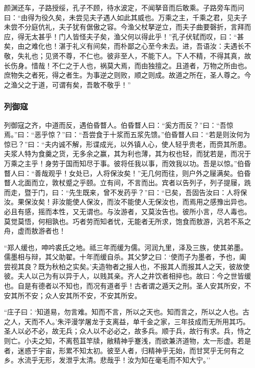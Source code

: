 \documentclass[]{article}
\begin{document}
颜渊还车，子路授绥，孔子不顾，待水波定，不闻拏音而后敢乘。子路旁车而问曰：``由得为役久矣，未尝见夫子遇人如此其威也。万乘之主，千乘之君，见夫子未尝不分庭伉礼，夫子犹有倨傲之容。今渔父杖拏逆立，而夫子曲要磬折，言拜而应，得无太甚乎！门人皆怪夫子矣，渔父何以得此乎！''孔子伏轼而叹，曰：``甚矣，由之难化也！湛于礼义有间矣，而朴鄙之心至今未去。进，吾语汝：夫遇长不敬，失礼也；见贤不尊，不仁也。彼非至人，不能下人。下人不精，不得其真，故长伤身。惜哉！不仁之于人也，祸莫大焉，而由独擅之。且道者，万物之所由也。庶物失之者死，得之者生。为事逆之则败，顺之则成。故道之所在，圣人尊之。今之渔父之于道，可谓有矣，吾敢不敬乎！''

\hypertarget{header-n500}{%
\subsubsection{列御寇}\label{header-n500}}

列御寇之齐，中道而反，遇伯昏瞀人。伯昏瞀人曰：``奚方而反？''曰：``吾惊焉。''曰：``恶乎惊？''曰：``吾尝食于十浆而五浆先馈。''伯昏瞀人曰：``若是则汝何为惊已？''曰：``夫内诚不解，形谍成光，以外镇人心，使人轻乎贵老，而赍其所患。夫浆人特为食羹之货，无多余之赢，其为利也薄，其为权也轻，而犹若是，而况于万乘之主乎！身劳于国而知尽于事。彼将任我以事，而效我以功。吾是以惊。''伯昏瞀人曰：``善哉观乎！女处已，人将保汝矣！''无几何而往，则户外之屦满矣。伯昏瞀人北面而立，敦杖蹙之乎颐。立有间，不言而出。宾者以告列子，列子提屦，跣而走，暨于门，曰：``先生既来，曾不发药乎？''曰：``已矣，吾固告汝曰：人将保汝。果保汝矣！非汝能使人保汝，而汝不能使人无保汝也，而焉用之感豫出异也。必且有感，摇而本性，又无谓也。与汝游者，又莫汝告也。彼所小言，尽人毒也。莫觉莫悟，何相孰也。巧者劳而知者忧，无能者无所求，饱食而敖游，汎若不系之舟，虚而敖游者也！

``郑人缓也，呻吟裘氏之地。祗三年而缓为儒。河润九里，泽及三族，使其弟墨。儒墨相与辩，其父助翟。十年而缓自杀。其父梦之曰：`使而子为墨者，予也，阖尝视其良？既为秋柏之实矣。'夫造物者之报人也，不报其人而报其人之天，彼故使彼。夫人以己为有以异于人，以贱其亲。齐人之井饮者相捽也。故曰：今之世皆缓也。自是有德者以不知也，而况有道者乎！古者谓之遁天之刑。圣人安其所安，不安其所不安；众人安其所不安，不安其所安。

``庄子曰：`知道易，勿言难。知而不言，所以之天也。知而言之，所以之人也。古之人，天而不人。'朱泙漫学屠龙于支离益，单千金之家，三年技成而无所用其巧。圣人以必不必，故无兵；众人以不必必之，故多兵。顺于兵，故行有求。兵，恃之则亡。小夫之知，不离苞苴竿牍，敝精神乎蹇浅，而欲兼济道物，太一形虚。若是者，迷惑于宇宙，形累不知太初。彼至人者，归精神乎无始，而甘冥乎无何有之乡。水流乎无形，发泄乎太清。悲哉乎！汝为知在毫毛而不知大宁。''
\end{document}
